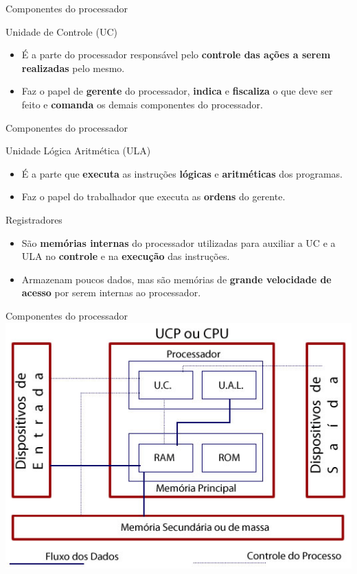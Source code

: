 \begin{frame}{Componentes do processador}
	\begin{block}{Unidade de Controle (UC)}
		\begin{itemize}
			\item É a parte do processador responsável pelo \textbf{controle das ações a serem realizadas} pelo mesmo.
			\item Faz o papel de \textbf{gerente} do processador, \textbf{indica} e \textbf{fiscaliza} o que deve ser feito e \textbf{comanda} os demais componentes do processador.
		\end{itemize}
	\end{block}

\end{frame}


\begin{frame}{Componentes do processador}
	\begin{block}{Unidade Lógica Aritmética (ULA)}
		\begin{itemize}
			\item É a parte que \textbf{executa} as instruções \textbf{lógicas} e \textbf{aritméticas} dos programas.
			\item Faz o papel do trabalhador que executa as \textbf{ordens} do gerente.
		\end{itemize}
	\end{block}

	\begin{block}{Registradores}
		\begin{itemize}
			\item São \textbf{memórias internas} do processador utilizadas para auxiliar a UC e a ULA no \textbf{controle} e na \textbf{execução} das instruções.
			\item Armazenam poucos dados, mas são memórias de \textbf{grande velocidade de acesso} por serem internas ao processador.
		\end{itemize}
	\end{block}
\end{frame}


\begin{frame}{Componentes do processador}
	\centering
	\includegraphics[width=1\linewidth]{Figuras/Ch02/fig7}
\end{frame}



